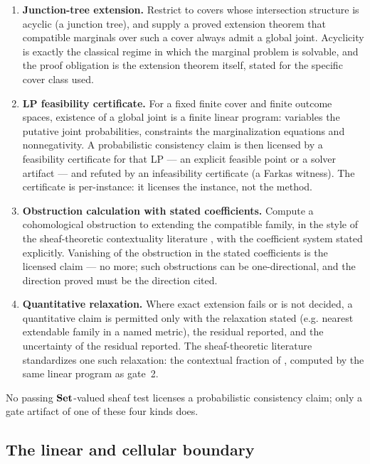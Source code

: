 \begin{protocol}
\label{ch12:prot:probgates}
\begin{enumerate}
\item \textbf{Junction-tree extension.} Restrict to covers whose
intersection structure is acyclic (a junction tree), and supply a proved
extension theorem that compatible marginals over such a cover always admit
a global joint. Acyclicity is exactly the classical regime in which the
marginal problem is solvable, and the proof obligation is the extension
theorem itself, stated for the specific cover class used.
\item \textbf{LP feasibility certificate.} For a fixed finite cover and
finite outcome spaces, existence of a global joint is a finite linear
program: variables the putative joint probabilities, constraints the
marginalization equations and nonnegativity. A probabilistic consistency
claim is then licensed by a feasibility certificate for that LP --- an
explicit feasible point or a solver artifact --- and refuted by an
infeasibility certificate (a Farkas witness). The certificate is
per-instance: it licenses the instance, not the method.
\item \textbf{Obstruction calculation with stated coefficients.} Compute a
cohomological obstruction to extending the compatible family, in the style
of the sheaf-theoretic contextuality literature
\cite{abramskycohomology}, with the coefficient system stated
explicitly. Vanishing of the obstruction in the stated coefficients is the
licensed claim --- no more; such obstructions can be one-directional, and
the direction proved must be the direction cited.
\item \textbf{Quantitative relaxation.} Where exact extension fails or is
not decided, a quantitative claim is permitted only with the relaxation
stated (e.g. nearest extendable family in a named metric), the residual
reported, and the uncertainty of the residual reported. The
sheaf-theoretic literature standardizes one such relaxation: the
contextual fraction of \cite{abramskyfraction}, computed by the same
linear program as gate~2.
\end{enumerate}
No passing $\mathbf{Set}$-valued sheaf test licenses a probabilistic consistency
claim; only a gate artifact of one of these four kinds does.
\end{protocol}

\subsection{The linear and cellular boundary}
\label{ch12:sec:linear}

